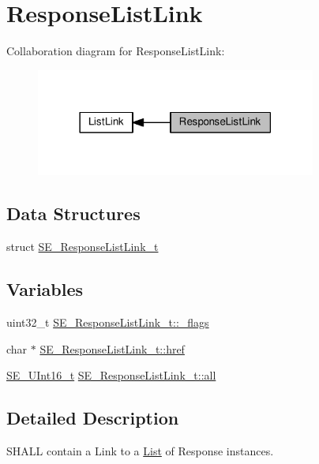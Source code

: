 \hypertarget{group__ResponseListLink}{}\section{Response\+List\+Link}
\label{group__ResponseListLink}
Collaboration diagram for Response\+List\+Link\+:\nopagebreak
\begin{figure}[H]
\begin{center}
\leavevmode
\includegraphics[width=261pt]{group__ResponseListLink}
\end{center}
\end{figure}
\subsection*{Data Structures}
\begin{DoxyCompactItemize}
\item 
struct \hyperlink{structSE__ResponseListLink__t}{S\+E\+\_\+\+Response\+List\+Link\+\_\+t}
\end{DoxyCompactItemize}
\subsection*{Variables}
\begin{DoxyCompactItemize}
\item 
uint32\+\_\+t \hyperlink{group__ResponseListLink_ga54194415a4458904a89ba172148b82e8}{S\+E\+\_\+\+Response\+List\+Link\+\_\+t\+::\+\_\+flags}
\item 
char $\ast$ \hyperlink{group__ResponseListLink_ga48bb0add8ae3c93f524b731f596f1343}{S\+E\+\_\+\+Response\+List\+Link\+\_\+t\+::href}
\item 
\hyperlink{group__UInt16_gac68d541f189538bfd30cfaa712d20d29}{S\+E\+\_\+\+U\+Int16\+\_\+t} \hyperlink{group__ResponseListLink_ga5cf19fe8f4b95dc44ce8305d28fb9fd8}{S\+E\+\_\+\+Response\+List\+Link\+\_\+t\+::all}
\end{DoxyCompactItemize}


\subsection{Detailed Description}
S\+H\+A\+LL contain a Link to a \hyperlink{structList}{List} of Response instances. 

